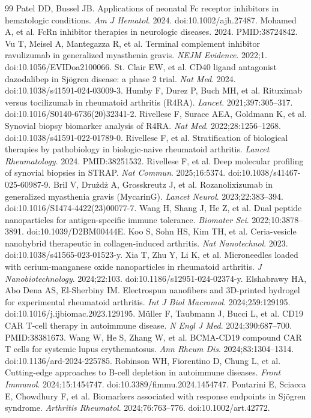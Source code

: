 \documentclass[12pt,a4paper]{article}
\begin{document}
\begin{thebibliography}{99}
 Patel DD, Bussel JB. Applications of neonatal Fc receptor inhibitors in hematologic conditions. \textit{Am J Hematol}. 2024. doi:10.1002/ajh.27487.
 Mohamed A, et al. FcRn inhibitor therapies in neurologic diseases. 2024. PMID:38724842.
 Vu T, Meisel A, Mantegazza R, et al. Terminal complement inhibitor ravulizumab in generalized myasthenia gravis. \textit{NEJM Evidence}. 2022;1. doi:10.1056/EVIDoa2100066.
 St. Clair EW, et al. CD40 ligand antagonist dazodalibep in Sjögren disease: a phase 2 trial. \textit{Nat Med}. 2024. doi:10.1038/s41591-024-03009-3.
 Humby F, Durez P, Buch MH, et al. Rituximab versus tocilizumab in rheumatoid arthritis (R4RA). \textit{Lancet}. 2021;397:305--317. doi:10.1016/S0140-6736(20)32341-2.
 Rivellese F, Surace AEA, Goldmann K, et al. Synovial biopsy biomarker analysis of R4RA. \textit{Nat Med}. 2022;28:1256--1268. doi:10.1038/s41591-022-01789-0.
 Rivellese F, et al. Stratification of biological therapies by pathobiology in biologic-naive rheumatoid arthritis. \textit{Lancet Rheumatology}. 2024. PMID:38251532.
 Rivellese F, et al. Deep molecular profiling of synovial biopsies in STRAP. \textit{Nat Commun}. 2025;16:5374. doi:10.1038/s41467-025-60987-9.
 Bril V, Drużdż A, Grosskreutz J, et al. Rozanolixizumab in generalized myasthenia gravis (MycarinG). \textit{Lancet Neurol}. 2023;22:383--394. doi:10.1016/S1474-4422(23)00077-7.
 Wang H, Shang J, He Z, et al. Dual peptide nanoparticles for antigen-specific immune tolerance. \textit{Biomater Sci}. 2022;10:3878--3891. doi:10.1039/D2BM00444E.
 Koo S, Sohn HS, Kim TH, et al. Ceria-vesicle nanohybrid therapeutic in collagen-induced arthritis. \textit{Nat Nanotechnol}. 2023. doi:10.1038/s41565-023-01523-y.
 Xia T, Zhu Y, Li K, et al. Microneedles loaded with cerium-manganese oxide nanoparticles in rheumatoid arthritis. \textit{J Nanobiotechnology}. 2024;22:103. doi:10.1186/s12951-024-02374-y.
 Elshabrawy HA, Abo Dena AS, El-Sherbiny IM. Electrospun nanofibers and 3D-printed hydrogel for experimental rheumatoid arthritis. \textit{Int J Biol Macromol}. 2024;259:129195. doi:10.1016/j.ijbiomac.2023.129195.
 Müller F, Taubmann J, Bucci L, et al. CD19 CAR T-cell therapy in autoimmune disease. \textit{N Engl J Med}. 2024;390:687--700. PMID:38381673.
 Wang W, He S, Zhang W, et al. BCMA-CD19 compound CAR T cells for systemic lupus erythematosus. \textit{Ann Rheum Dis}. 2024;83:1304--1314. doi:10.1136/ard-2024-225785.
 Robinson WH, Fiorentino D, Chung L, et al. Cutting-edge approaches to B-cell depletion in autoimmune diseases. \textit{Front Immunol}. 2024;15:1454747. doi:10.3389/fimmu.2024.1454747.
 Pontarini E, Sciacca E, Chowdhury F, et al. Biomarkers associated with response endpoints in Sjögren syndrome. \textit{Arthritis Rheumatol}. 2024;76:763--776. doi:10.1002/art.42772.
\end{thebibliography}
\end{document}
